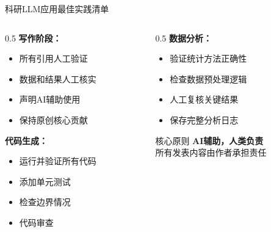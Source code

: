 \documentclass[aspectratio=169,11pt]{beamer}
\begin{document}
\begin{frame}{科研LLM应用最佳实践清单}
    \begin{columns}
        \begin{column}{0.5\textwidth}
            \textbf{写作阶段：}
            \begin{itemize}
                \item[$\square$] 所有引用人工验证
                \item[$\square$] 数据和结果人工核实
                \item[$\square$] 声明AI辅助使用
                \item[$\square$] 保持原创核心贡献
            \end{itemize}
            
            \vspace{0.3cm}
            \textbf{代码生成：}
            \begin{itemize}
                \item[$\square$] 运行并验证所有代码
                \item[$\square$] 添加单元测试
                \item[$\square$] 检查边界情况
                \item[$\square$] 代码审查
            \end{itemize}
        \end{column}
        \begin{column}{0.5\textwidth}
            \textbf{数据分析：}
            \begin{itemize}
                \item[$\square$] 验证统计方法正确性
                \item[$\square$] 检查数据预处理逻辑
                \item[$\square$] 人工复核关键结果
                \item[$\square$] 保存完整分析日志
            \end{itemize}
            
            \vspace{0.3cm}
            \begin{alertblock}{核心原则}
                \large
                \centering
                \textbf{AI辅助，人类负责}\\
                \small
                所有发表内容由作者承担责任
            \end{alertblock}
        \end{column}
    \end{columns}
\end{frame}
\end{document}
